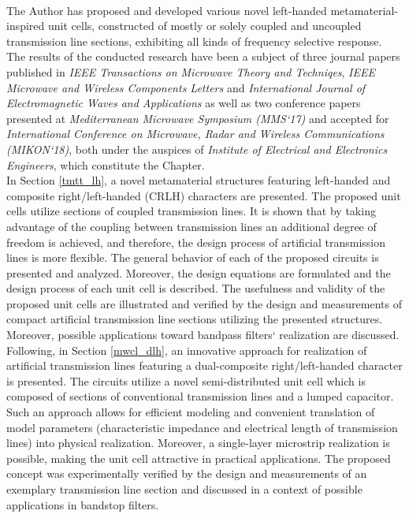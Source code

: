 \\
\indent The Author has proposed and developed various novel left-handed metamaterial-inspired unit cells, constructed of mostly or solely coupled and uncoupled transmission line sections, exhibiting all kinds of frequency selective response. The results of the conducted research have been a subject of three journal papers  published in \textit{IEEE Transactions on Microwave Theory and Techniqes}, \textit{IEEE Microwave and Wireless Components Letters} and \textit{International Journal of Electromagnetic Waves and Applications} as well as two conference papers presented at \textit{Mediterranean Microwave Symposium (MMS`17)} and accepted for \textit{International Conference on Microwave, Radar and Wireless Communications (MIKON`18)}, both under the auspices of \textit{Institute of Electrical and Electronics Engineers}, which constitute the Chapter.
\\
\indent In Section \ref{tmtt_lh}, a novel metamaterial structures featuring left-handed and composite right/left-handed (CRLH) characters are presented. The proposed unit cells utilize sections of coupled transmission lines. It is shown that by taking advantage of the coupling between transmission lines an additional degree of freedom is achieved, and therefore, the design process of artificial transmission lines is more flexible. The general behavior of each of the proposed circuits is presented and analyzed. Moreover, the design equations are formulated and the design process of each unit cell is described. The usefulness and validity of the proposed unit cells are illustrated and verified by the design and measurements of compact artificial transmission line sections utilizing the presented structures. Moreover, possible applications toward bandpass filters` realization are discussed.
\\
\indent Following, in Section \ref{mwcl_dlh}, an innovative approach for realization of artificial transmission lines featuring a dual-composite right/left-handed character is presented. The circuits utilize a novel semi-distributed unit cell which is composed of sections of conventional transmission lines and a lumped capacitor. Such an approach allows for efficient modeling and convenient translation of model parameters (characteristic impedance and electrical length of transmission lines) into physical realization. Moreover, a single-layer microstrip realization is possible, making the unit cell attractive in practical applications. The proposed concept was experimentally verified by the design and measurements of an exemplary transmission line section and discussed in a context of possible applications in bandstop filters.
